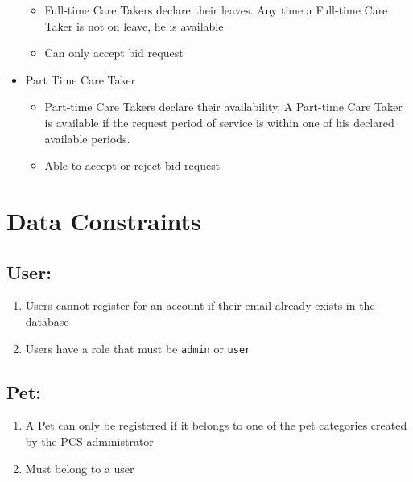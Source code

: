 \documentclass[
  paper=a4,
  ,captions=tableheading
]{scrartcl}
\newcommand{\passthrough}[1]{#1}
\providecommand{\tightlist}{%
  \setlength{\itemsep}{0pt}\setlength{\parskip}{0pt}}
\begin{document}
\begin{itemize}
  \begin{itemize}
  \tightlist
  \item
    Full-time Care Takers declare their leaves. Any time a Full-time
    Care Taker is not on leave, he is available
  \item
    Can only accept bid request
  \end{itemize}
\item
  Part Time Care Taker

  \begin{itemize}
  \tightlist
  \item
    Part-time Care Takers declare their availability. A Part-time Care
    Taker is available if the request period of service is within one of
    his declared available periods.
  \item
    Able to accept or reject bid request
  \end{itemize}
\end{itemize}

\hypertarget{data-constraints}{%
\section{Data Constraints}\label{data-constraints}}

\hypertarget{user}{%
\subsection{User:}\label{user}}

\begin{enumerate}
\def\labelenumi{\arabic{enumi}.}
\tightlist
\item
  Users cannot register for an account if their email already exists in
  the database
\item
  Users have a role that must be \passthrough{\lstinline!admin!} or
  \passthrough{\lstinline!user!}
\end{enumerate}

\hypertarget{pet}{%
\subsection{Pet:}\label{pet}}

\begin{enumerate}
\def\labelenumi{\arabic{enumi}.}
\tightlist
\item
  A Pet can only be registered if it belongs to one of the pet
  categories created by the PCS administrator
\item
  Must belong to a user
\end{enumerate}
\end{document}

